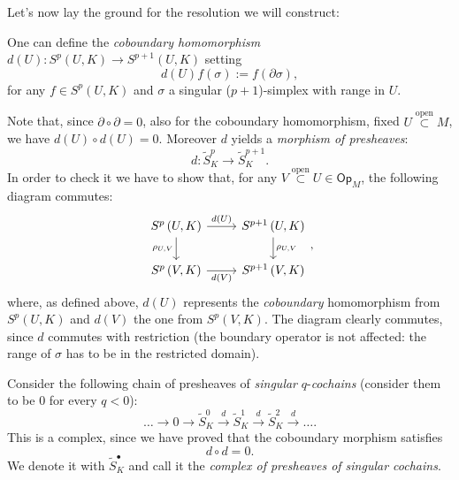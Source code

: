 Let's now lay the ground for the resolution we will construct:
\begin{defn}
	One can define the \textit{coboundary homomorphism} $d(U): S^p \left(U, K\right) \to S^{p+1} \left(U, K\right)$ setting
	\begin{equation}
		d(U)f (\sigma) := f(\partial \sigma)
	,\end{equation} 
	for any $f \in S^p \left(U, K\right)$ and $\sigma$ a singular ($p+1$)-simplex with range in $U$.
\end{defn}

\begin{rem}
	Note that, since $\partial \circ \partial = 0$, also for the coboundary homomorphism, fixed $U \stackrel{\text{open}}{\subset} M$, we have $d(U) \circ d(U) = 0$.
	Moreover $d$ yields a \textit{morphism of presheaves}:
	\begin{equation}
		d: \widetilde{S}_K^p \to \widetilde{S}_K^{p+1}
	.\end{equation}
	In order to check it we have to show that, for any $V \stackrel{\text{open}}{\subset} U \in \mathsf{Op}_M$, the following diagram commutes:
	\begin{equation}
	\begin{tikzcd}
		S^p \left(U, K\right) \arrow[r, "{d(U)}", rightarrow] \arrow[d, "{\rho_{U,V}}"', rightarrow] & S^{p+1} \left(U, K\right) \arrow[d, "{\rho_{U,V}}", rightarrow] \\
		S^p \left(V, K\right) \arrow[r, "{d(V)}"', rightarrow] & S^{p+1} \left(V, K\right)
	\end{tikzcd}
	,\end{equation} 
	where, as defined above, $d(U)$ represents the \textit{coboundary} homomorphism from $S^p \left(U, K\right)$ and $d(V)$ the one from $S^p \left(V, K\right)$.
	The diagram clearly commutes, since $d$ commutes with restriction (the boundary operator is not affected: the range of $\sigma$ has to be in the restricted domain).
\end{rem}

\begin{defn}\label{def:precocomp}
	Consider the following chain of presheaves of \textit{singular} $q$-\textit{cochains} (consider them to be $0$ for every $q < 0$):
	\begin{equation}
		\ldots \to 0 \to \widetilde{S}^0_K \xrightarrow{d} \widetilde{S}^1_K \xrightarrow{d} \widetilde{S}^2_K \xrightarrow{d} \ldots
	.\end{equation}
	This is a complex, since we have proved that the coboundary morphism satisfies
	\begin{equation}
	d \circ d = 0
	.\end{equation}
	We denote it with $\widetilde{S}^\bullet_K$ and call it the \textit{complex of presheaves of singular cochains}.
\end{defn}

